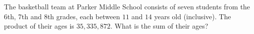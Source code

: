The basketball team at Parker Middle School consists of seven students from the 6th, 7th and 8th grades, each between $11$ and $14$ years old (inclusive). The product of their ages is $35{,}335{,}872$. What is the sum of their ages?
